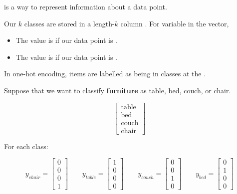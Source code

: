         \begin{definition}
             is a way to represent  information about a data point.
            
            Our $k$ classes are stored in a length-$k$ column . For  variable in the vector, 
            
            \begin{itemize}
                \item The value is  if our data point is .
                \item The value is  if our data point is .
            \end{itemize}
            
            In one-hot encoding, items are  labelled as being in  classes at the .
        \end{definition}
        
        \miniex Suppose that we want to classify \textbf{furniture} as table, bed, couch, or chair.
        
        \begin{equation}
            \begin{bmatrix}
              \text{table} \\ \text{bed} \\ \text{couch} \\ \text{chair} 
            \end{bmatrix}
        \end{equation}
        
        For each class:
        
        \begin{equation}
            y_{chair} = 
            \begin{bmatrix}
              0\\0\\0\\1
            \end{bmatrix}
            \qquad
            y_{table} = 
            \begin{bmatrix}
              1\\0\\0\\0
            \end{bmatrix}
            \qquad
            y_{couch} = 
            \begin{bmatrix}
              0\\0\\1\\0
            \end{bmatrix}
            \qquad
            y_{bed} = 
            \begin{bmatrix}
              0\\1\\0\\0
            \end{bmatrix}
        \end{equation}
        